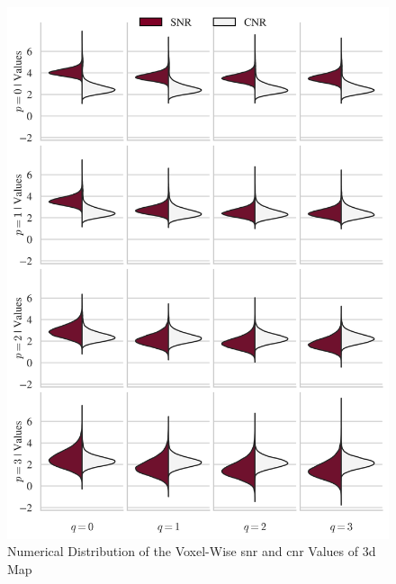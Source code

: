 \begin{figure}[htbp!]
\centering
\includegraphics{images/cnrsnr3d.png}
\caption{Numerical Distribution of the Voxel-Wise \gls{snr} and \gls{cnr} Values of \gls{3d} Map}
\label{fig:cnrsnr3d}
\end{figure}

